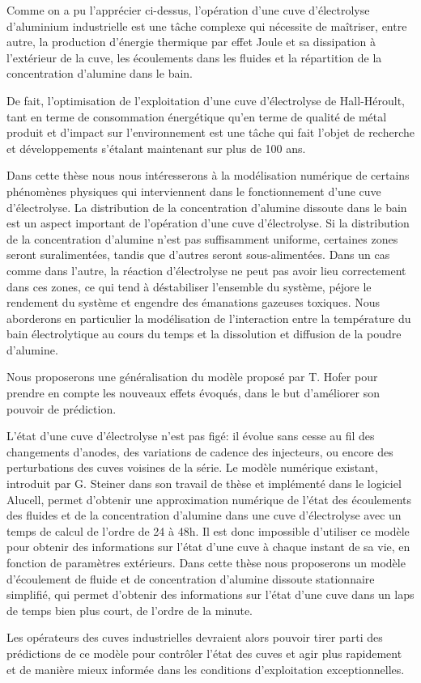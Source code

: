 Comme on a pu l'apprécier ci-dessus, l'opération d'une cuve
d'électrolyse d'aluminium industrielle est une tâche complexe qui
nécessite de maîtriser, entre autre, la production d'énergie thermique
par effet Joule et sa dissipation à l'extérieur de la cuve, les
écoulements dans les fluides et la répartition de la concentration
d'alumine dans le bain.

De fait, l'optimisation de l'exploitation d'une cuve d'électrolyse de
Hall-Héroult, tant en terme de consommation énergétique qu'en terme de
qualité de métal produit et d'impact sur l'environnement est une tâche
qui fait l'objet de recherche et développements s'étalant maintenant
sur plus de 100 ans.

Dans cette thèse nous nous intéresserons à la modélisation numérique
de certains phénomènes physiques qui interviennent dans le
fonctionnement d'une cuve d'électrolyse. La distribution de la
concentration d'alumine dissoute dans le bain est un aspect important
de l'opération d'une cuve d'électrolyse. Si la distribution de la
concentration d'alumine n'est pas suffisamment uniforme, certaines
zones seront suralimentées, tandis que d'autres seront
sous-alimentées. Dans un cas comme dans l'autre, la réaction
d'électrolyse ne peut pas avoir lieu correctement dans ces zones, ce
qui tend à déstabiliser l'ensemble du système, péjore le rendement du
système et engendre des émanations gazeuses toxiques. Nous aborderons
en particulier la modélisation de l'interaction entre la température
du bain électrolytique au cours du temps et la dissolution et
diffusion de la poudre d'alumine.

Nous proposerons une généralisation du modèle proposé par
T. Hofer \cite{Hofer2011} pour prendre en compte les nouveaux effets
évoqués, dans le but d'améliorer son pouvoir de prédiction.

L'état d'une cuve d'électrolyse n'est pas figé: il évolue sans cesse
au fil des changements d'anodes, des variations de cadence des
injecteurs, ou encore des perturbations des cuves voisines de la
série. Le modèle numérique existant, introduit par G. Steiner dans son
travail de thèse \cite{Steiner2009} et implémenté dans le logiciel
Alucell, permet d'obtenir une approximation numérique de l'état des
écoulements des fluides et de la concentration d'alumine dans une cuve
d'électrolyse avec un temps de calcul de l'ordre de \num{24} à
\num{48}\si{\hour}. Il est donc impossible d'utiliser ce modèle pour
obtenir des informations sur l'état d'une cuve à chaque instant de sa
vie, en fonction de paramètres extérieurs. Dans cette thèse nous
proposerons un modèle d'écoulement de fluide et de concentration
d'alumine dissoute stationnaire simplifié, qui permet d'obtenir des
informations sur l'état d'une cuve dans un laps de temps bien plus
court, de l'ordre de la minute.

Les opérateurs des cuves industrielles devraient alors pouvoir tirer
parti des prédictions de ce modèle pour contrôler l'état des cuves
et agir plus rapidement et de manière mieux informée dans les
conditions d'exploitation exceptionnelles.
